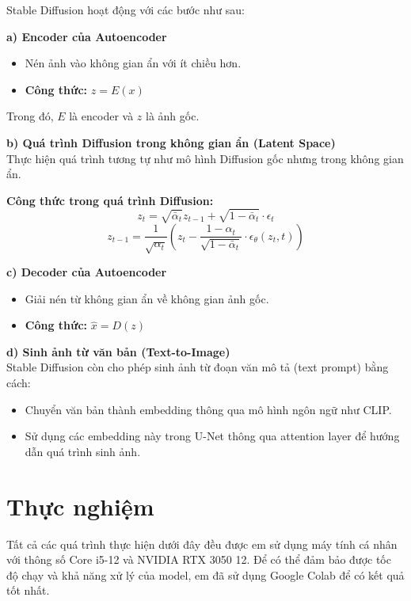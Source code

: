 \documentclass[12pt]{report}
\begin{document}
Stable Diffusion hoạt động với các bước như sau:

\textbf{a) Encoder của Autoencoder} \\
\begin{itemize}
    \item Nén ảnh vào không gian ẩn với ít chiều hơn.
    \item \textbf{Công thức:} \quad \( z = E(x) \)
\end{itemize}

Trong đó, \( E \) là encoder và \( z \) là ảnh gốc.

\textbf{b) Quá trình Diffusion trong không gian ẩn (Latent Space)} \\
Thực hiện quá trình tương tự như mô hình Diffusion gốc nhưng trong không gian ẩn.

\textbf{Công thức trong quá trình Diffusion:}
\[
z_t = \sqrt{\bar{\alpha}_t} z_{t-1} + \sqrt{1 - \bar{\alpha}_t} \cdot \epsilon_t
\]
\[
z_{t-1} = \frac{1}{\sqrt{\alpha_t}} \left(z_t - \frac{1 - \alpha_t}{\sqrt{1 - \bar{\alpha}_t}} \cdot \epsilon_\theta(z_t, t)\right)
\]

\textbf{c) Decoder của Autoencoder} \\
\begin{itemize}
    \item Giải nén từ không gian ẩn về không gian ảnh gốc.
    \item \textbf{Công thức:} \quad \( \hat{x} = D(z) \)
\end{itemize}

\textbf{d) Sinh ảnh từ văn bản (Text-to-Image)} \\
Stable Diffusion còn cho phép sinh ảnh từ đoạn văn mô tả (text prompt) bằng cách:
\begin{itemize}
    \item Chuyển văn bản thành embedding thông qua mô hình ngôn ngữ như CLIP.
    \item Sử dụng các embedding này trong U-Net thông qua attention layer để hướng dẫn quá trình sinh ảnh.
\end{itemize}

\section*{Thực nghiệm}

Tất cả các quá trình thực hiện dưới đây đều được em sử dụng máy tính cá nhân với thông số Core i5-12 và NVIDIA RTX 3050 12. Để có thể đảm bảo được tốc độ chạy và khả năng xử lý của model, em đã sử dụng Google Colab để có kết quả tốt nhất.
\end{document}

